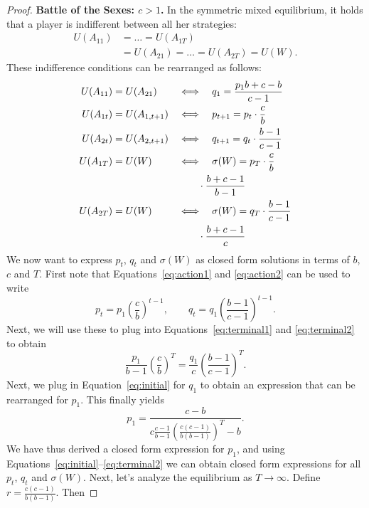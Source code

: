 \documentclass[letterpaper]{article}
\newcommand{\bparam}{b}
\newcommand{\cparam}{c}
\theoremstyle{definition}
\begin{document}
\begin{proof}
\textbf{Battle of the Sexes: $\cparam>1$.}
In the symmetric mixed equilibrium, it holds that a player is indifferent between all her strategies:
\[
\begin{aligned}
U(A_{11}) &= \dots = U(A_{1T})\\
&= U(A_{21}) = \dots = U(A_{2T}) = U(W).
\end{aligned}
\]
These indifference conditions can be rearranged as follows:
\begin{align}
U(A_{11}) &= U(A_{21})
&&\Longleftrightarrow \quad q_1 = \frac{p_1 \bparam +\cparam-\bparam}{\cparam-1}
\label{eq:initial} \\
%
U(A_{1t}) &= U(A_{1,t+1})
&&\Longleftrightarrow \quad p_{t+1} = p_t\cdot\frac{\cparam}{\bparam}
\label{eq:action1} \\
%
U(A_{2t}) &= U(A_{2,t+1})
&&\Longleftrightarrow \quad q_{t+1} = q_t\cdot\frac{\bparam-1}{\cparam-1}
\label{eq:action2} \\
%
U(A_{1T}) &= U(W)
&&\Longleftrightarrow \quad \sigma(W)
= p_T\cdot\frac{\cparam}{\bparam} \notag\\
&&&\qquad {}\cdot\frac{\bparam+\cparam-1}{\bparam-1}
\label{eq:terminal1} \\
%
U(A_{2T}) &= U(W)
&&\Longleftrightarrow \quad \sigma(W)
= q_T \cdot \frac{\bparam-1}{\cparam-1} \notag\\
&&&\qquad {}\cdot\frac{\bparam+\cparam-1}{\cparam}
\label{eq:terminal2}
\end{align}
We now want to express $p_t$, $q_t$ and $\sigma(W)$ as closed form solutions in terms of $\bparam$, $\cparam$ and $T$. First note that Equations~\eqref{eq:action1} and \eqref{eq:action2} can be used to write
\[
p_t = p_1 \left(\frac{\cparam}{\bparam}\right)^{t-1}, \qquad
q_t = q_1 \left(\frac{\bparam-1}{\cparam-1}\right)^{t-1}.
\]
Next, we will use these to plug into Equations~\eqref{eq:terminal1} and \eqref{eq:terminal2} to obtain
\[
\frac{p_1}{\bparam-1} \left(\frac{\cparam}{\bparam}\right)^{T}
= \frac{q_1}{\cparam} \left(\frac{\bparam-1}{\cparam-1}\right)^{T}.
\]
Next, we plug in Equation~\eqref{eq:initial} for $q_1$ to obtain an expression that can be rearranged for $p_1$. This finally yields
\begin{equation}
   p_1 = \frac{\cparam-\bparam}{\cparam\frac{\cparam-1}{\bparam-1}\left(\frac{\cparam(\cparam-1)}{\bparam(\bparam-1)}\right)^{T}-\bparam}.
   \label{eq:p_deriv}
\end{equation}
We have thus derived a closed form expression for $p_1$, and using Equations~\eqref{eq:initial}--\eqref{eq:terminal2} we can obtain closed form expressions for all $p_t$, $q_t$ and $\sigma(W)$. Next, let's analyze the equilibrium as $T\to\infty$. Define $r=\frac{\cparam(\cparam-1)}{\bparam(\bparam-1)}$. Then

\end{proof}
\end{document}
